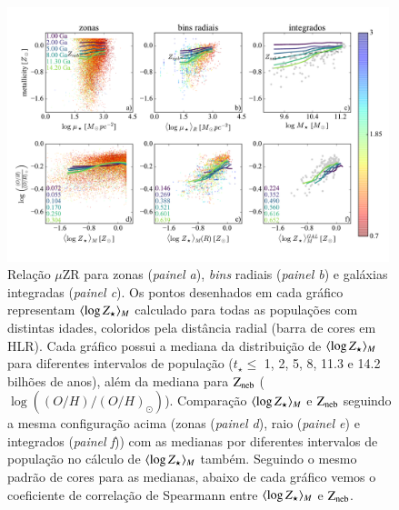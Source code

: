 \begin{figure}
	\centering
	\includegraphics[width=0.99\textwidth]{figuras/stellar_muZR_realsample.pdf}
	\caption[Relação $\mu$ZR e comparação entre as metalicidades.]
	{Relação $\mu$ZR para zonas ({\em painel a}), {\em bins} radiais ({\em painel b}) e galáxias
integradas ({\em painel c}). Os pontos desenhados em cada gráfico representam $\meanM{\log Z_\star}$
calculado para todas as populações com distintas idades, coloridos pela distância radial (barra de
cores em HLR). Cada gráfico possui a mediana da distribuição de $\meanM{\log Z_\star}$ para
diferentes intervalos de população ($t_\star \leq$ 1, 2, 5, 8, 11.3 e 14.2 bilhões de anos), além
da mediana para $\mathrm{Z}_{\mathrm{neb}}$ ($\log\left((O/H)/(O/H)_\odot\right)$). Comparação $\meanM{\log Z_\star}$ e
$\mathrm{Z}_{\mathrm{neb}}$ seguindo a mesma configuração acima (zonas ({\em painel d}), raio ({\em painel e}) e
integrados ({\em painel f})) com as medianas por diferentes intervalos de população no cálculo de
$\meanM{\log Z_\star}$ também. Seguindo o mesmo padrão de cores para as medianas, abaixo de cada
gráfico vemos o coeficiente de correlação de Spearmann entre $\meanM{\log Z_\star}$ e $\mathrm{Z}_{\mathrm{neb}}$.}
	\label{fig:ZstarvsZneb}
\end{figure}

